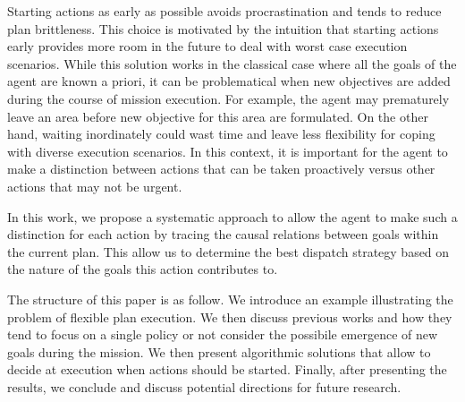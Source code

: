 Starting actions as early as possible avoids procrastination and tends
to reduce plan brittleness. This choice
is motivated by the intuition that starting actions early provides more
room in the future to deal with worst case execution scenarios. While
this solution works in the classical case where all the goals of the
agent are known a priori, it can be problematical when new objectives
are added during the course of mission execution. For example, the
agent may prematurely leave an area before new objective for this area
are formulated. On the other hand, waiting inordinately could wast
time and leave less flexibility for coping with diverse execution
scenarios. 
In this context, it is important for the agent to make a distinction
between actions that can be taken proactively versus other actions
that may not be urgent.  

In this work, we propose a systematic approach to allow the agent to
make such a distinction for each action by tracing the causal relations
between goals within the current plan.  This allow us to determine the
best dispatch strategy based on the nature of the goals this action
contributes to.

The structure of this paper is as follow. We introduce an example
illustrating the problem of flexible plan execution. We then discuss
previous works and how they tend to focus on a single policy or not
consider the possibile emergence of new goals during the mission. We
then present algorithmic solutions that allow to decide at execution
when actions should be started. Finally, after presenting the results,
we conclude and discuss potential directions for future research.




